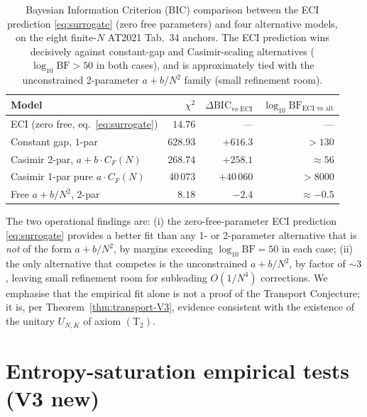 \documentclass[11pt,a4paper,reqno]{amsart}
\theoremstyle{definition}
\newcommand{\Ctwo}{(\mathrm{T}_{2})}
\begin{document}
\begin{table}[ht]
\centering
\begin{tabular}{lrrr}
\toprule
Model & $\chi^2$ & $\Delta\text{BIC}_{\text{vs ECI}}$ &
$\log_{10}\text{BF}_{\text{ECI vs alt}}$ \\
\midrule
ECI (zero free, eq.~\eqref{eq:surrogate}) & $14.76$ & --- & --- \\
Constant gap, $1$-par                     & $628.93$ & $+616.3$ & $> 130$ \\
Casimir 2-par, $a + b\cdot C_F(N)$        & $268.74$ & $+258.1$ & $\approx 56$ \\
Casimir 1-par pure $a\cdot C_F(N)$        & $40\,073$ & $+40\,060$ & $> 8000$ \\
Free $a + b/N^2$, 2-par                   & $8.18$  & $-2.4$   & $\approx -0.5$ \\
\bottomrule
\end{tabular}
\caption{Bayesian Information Criterion (BIC) comparison between
the ECI prediction \eqref{eq:surrogate} (zero free parameters) and
four alternative models, on the eight finite-$N$ AT2021 Tab.~34
anchors. The ECI prediction wins decisively against constant-gap
and Casimir-scaling alternatives ($\log_{10}\text{BF} > 50$ in
both cases), and is approximately tied with the unconstrained
2-parameter $a + b/N^2$ family (small refinement room).}\label{tab:bayes}
\end{table}

\noindent The two operational findings are: (i) the
zero-free-parameter ECI prediction \eqref{eq:surrogate} provides a
better fit than any 1- or 2-parameter alternative that is
\emph{not} of the form $a + b/N^2$, by margins exceeding
$\log_{10}\text{BF} = 50$ in each case; (ii) the only alternative
that competes is the unconstrained $a + b/N^2$, by factor of
$\sim 3$, leaving small refinement room for subleading $O(1/N^4)$
corrections. We emphasise that the empirical fit alone is not a
proof of the Transport Conjecture; it is, per
Theorem~\ref{thm:transport-V3}, evidence consistent with the
existence of the unitary $U_{N,K}$ of axiom $\Ctwo$.

\section{Entropy-saturation empirical tests (V3 new)}\label{sec:entropy}
\end{document}
